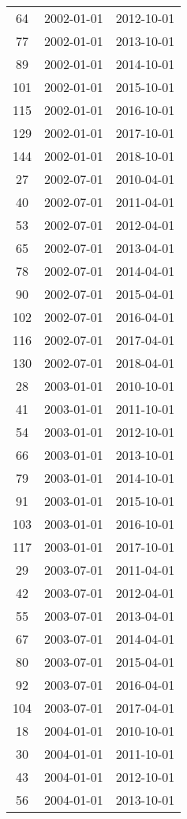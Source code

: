 \begin{tabular}{ccc}
  64 & 2002-01-01 & 2012-10-01 \\ 
  77 & 2002-01-01 & 2013-10-01 \\ 
  89 & 2002-01-01 & 2014-10-01 \\ 
  101 & 2002-01-01 & 2015-10-01 \\ 
  115 & 2002-01-01 & 2016-10-01 \\ 
  129 & 2002-01-01 & 2017-10-01 \\ 
  144 & 2002-01-01 & 2018-10-01 \\ 
  27 & 2002-07-01 & 2010-04-01 \\ 
  40 & 2002-07-01 & 2011-04-01 \\ 
  53 & 2002-07-01 & 2012-04-01 \\ 
  65 & 2002-07-01 & 2013-04-01 \\ 
  78 & 2002-07-01 & 2014-04-01 \\ 
  90 & 2002-07-01 & 2015-04-01 \\ 
  102 & 2002-07-01 & 2016-04-01 \\ 
  116 & 2002-07-01 & 2017-04-01 \\ 
  130 & 2002-07-01 & 2018-04-01 \\ 
  28 & 2003-01-01 & 2010-10-01 \\ 
  41 & 2003-01-01 & 2011-10-01 \\ 
  54 & 2003-01-01 & 2012-10-01 \\ 
  66 & 2003-01-01 & 2013-10-01 \\ 
  79 & 2003-01-01 & 2014-10-01 \\ 
  91 & 2003-01-01 & 2015-10-01 \\ 
  103 & 2003-01-01 & 2016-10-01 \\ 
  117 & 2003-01-01 & 2017-10-01 \\ 
  29 & 2003-07-01 & 2011-04-01 \\ 
  42 & 2003-07-01 & 2012-04-01 \\ 
  55 & 2003-07-01 & 2013-04-01 \\ 
  67 & 2003-07-01 & 2014-04-01 \\ 
  80 & 2003-07-01 & 2015-04-01 \\ 
  92 & 2003-07-01 & 2016-04-01 \\ 
  104 & 2003-07-01 & 2017-04-01 \\ 
  18 & 2004-01-01 & 2010-10-01 \\ 
  30 & 2004-01-01 & 2011-10-01 \\ 
  43 & 2004-01-01 & 2012-10-01 \\ 
  56 & 2004-01-01 & 2013-10-01 \\ 

\end{tabular}
